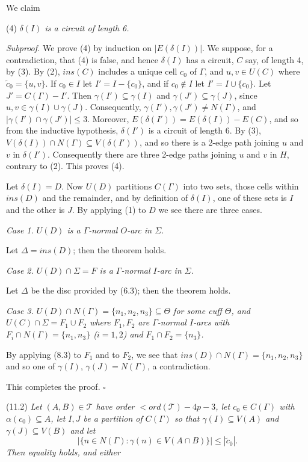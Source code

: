 We claim

\hspace*{12pt}(4) \textit{$\delta(I)$ is a circuit of length 6.}

\textit{Subproof.} We prove (4) by induction on $|E(\delta(I))|$. We suppose, for a contradiction, that (4) is false, and hence $\delta(I)$ has a circuit, $C$ say, of length 4, by (3). By (2), $ins(C)$ includes a unique cell $c_0$ of $\Gamma$, and $u, v \in U(C)$ where $\tilde{c}_0 = \{u, v\}$. If $c_0 \in I$ let $I' = I - \{c_0\}$, and if $c_0 \notin I$ let $I' = I \cup \{c_0\}$. Let $J' = C(\Gamma) - I'$. Then $\gamma(I') \subseteq \gamma(I)$ and $\gamma(J') \subseteq \gamma(J)$, since $u, v \in \gamma(I) \cup \gamma(J)$. Consequently, $\gamma(I'), \gamma(J') \ne N(\Gamma)$, and $|\gamma(I') \cap \gamma(J')| \le 3$. Moreover, $E(\delta(I')) = E(\delta(I)) - E(C)$, and so from the inductive hypothesis, $\delta(I')$ is a circuit of length 6. By (3), $V(\delta(I)) \cap N(\Gamma) \subseteq V(\delta(I'))$, and so there is a 2-edge path joining $u$ and $v$ in $\delta(I')$. Consequently there are three 2-edge paths joining $u$ and $v$ in $H$, contrary to (2). This proves (4).

Let $\delta(I) = D$. Now $U(D)$ partitions $C(\Gamma)$ into two sets, those cells within $ins(D)$ and the remainder, and by definition of $\delta(I)$, one of these sets is $I$ and the other is $J$. By applying (1) to $D$ we see there are three cases.

\textit{Case 1. $U(D)$ is a $\Gamma$-normal $O$-arc in $\Sigma$.}

Let $\Delta = ins(D)$; then the theorem holds.

\textit{Case 2. $U(D) \cap \Sigma = F$ is a $\Gamma$-normal $I$-arc in $\Sigma$.}

Let $\Delta$ be the disc provided by (6.3); then the theorem holds.

\textit{Case 3. $U(D) \cap N(\Gamma) = \{n_1, n_2, n_3\} \subseteq \Theta$ for some cuff $\Theta$, and $U(C) \cap \Sigma = F_1 \cup F_2$ where $F_1, F_2$ are $\Gamma$-normal $I$-arcs with $F_i \cap N(\Gamma) = \{n_1, n_3\}$ ($i = 1, 2$) and $F_1 \cap F_2 = \{n_3\}$.}

By applying (8.3) to $F_1$ and to $F_2$, we see that $ins(D) \cap N(\Gamma) = \{n_1, n_2, n_3\}$ and so one of $\gamma(I)$, $\gamma(J) = N(\Gamma)$, a contradiction.

This completes the proof. $\square$

\stmt
(11.2) \textit{Let $(A, B) \in \mathscr{T}$ have order $< ord(\mathscr{T}) - 4p - 3$, let $c_0 \in C(\Gamma)$ with $\alpha(c_0) \subseteq A$, let $I, J$ be a partition of $C(\Gamma)$ so that $\gamma(I) \subseteq V(A)$ and $\gamma(J) \subseteq V(B)$ and let}
\begin{equation*}
|\{n \in N(\Gamma) : \gamma(n) \in V(A \cap B)\}| \le |\tilde{c}_0|.
\end{equation*}
\textit{Then equality holds, and either}

